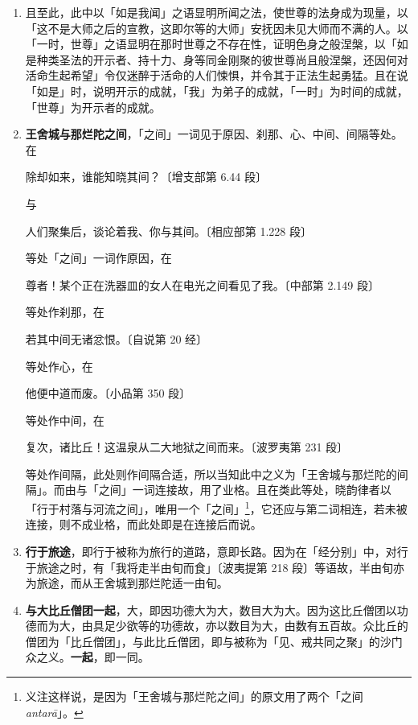 \begin{enumerate}
\item 且至此，此中以「如是我闻」之语显明所闻之法，使世尊的法身成为现量，以「这不是大师之后的宣教，这即尔等的大师」安抚因未见大师而不满的人。以「一时，世尊」之语显明在那时世尊之不存在性，证明色身之般涅槃，以「如是种类圣法的开示者、持十力、身等同金刚聚的彼世尊尚且般涅槃，还因何对活命生起希望」令仅迷醉于活命的人们悚惧，并令其于正法生起勇猛。且在说「如是」时，说明开示的成就，「我」为弟子的成就，「一时」为时间的成就，「世尊」为开示者的成就。
\item \textbf{王舍城与那烂陀之间}，「之间」一词见于原因、刹那、心、中间、间隔等处。在\begin{quoting}除却如来，谁能知晓其间？{\bluefootnotesize 〔增支部第 6.44 段〕}\end{quoting}与\begin{quoting}人们聚集后，谈论着我、你与其间。{\bluefootnotesize 〔相应部第 1.228 段〕}\end{quoting}等处「之间」一词作原因，在\begin{quoting}尊者！某个正在洗器皿的女人在电光之间看见了我。{\bluefootnotesize 〔中部第 2.149 段〕}\end{quoting}等处作刹那，在\begin{quoting}若其中间无诸忿恨。{\bluefootnotesize 〔自说第 20 经〕}\end{quoting}等处作心，在\begin{quoting}他便中道而废。{\bluefootnotesize 〔小品第 350 段〕}\end{quoting}等处作中间，在\begin{quoting}复次，诸比丘！这温泉从二大地狱之间而来。{\bluefootnotesize 〔波罗夷第 231 段〕}\end{quoting}等处作间隔，此处则作间隔合适，所以当知此中之义为「王舍城与那烂陀的间隔」。而由与「之间」一词连接故，用了业格。且在类此等处，晓韵律者以「行于村落与河流之间」，唯用一个「之间」\footnote{义注这样说，是因为「王舍城与那烂陀之间」的原文用了两个「之间 \textit{antarā}」。}，它还应与第二词相连，若未被连接，则不成业格，而此处即是在连接后而说。
\item \textbf{行于旅途}，即行于被称为旅行的道路，意即长路。因为在「经分别」中，对行于旅途之时，有「我将走半由旬而食」{\bluefootnotesize 〔波夷提第 218 段〕}等语故，半由旬亦为旅途，而从王舍城到那烂陀适一由旬。
\item \textbf{与大比丘僧团一起}，大，即因功德大为大，数目大为大。因为这比丘僧团以功德而为大，由具足少欲等的功德故，亦以数目为大，由数有五百故。众比丘的僧团为「比丘僧团」，与此比丘僧团，即与被称为「见、戒共同之聚」的沙门众之义。\textbf{一起}，即一同。

\end{enumerate}
